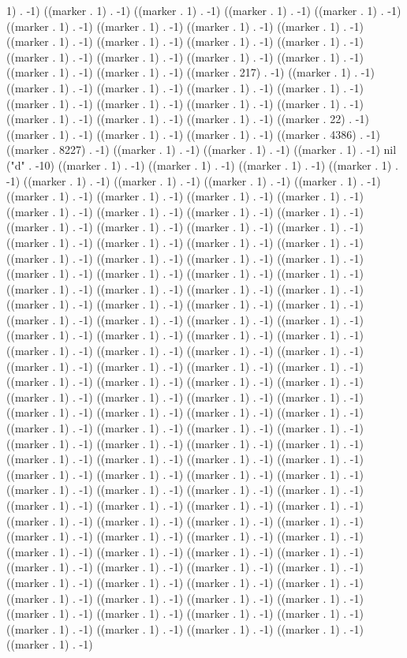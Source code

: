 1) . -1) ((marker . 1) . -1) ((marker . 1) . -1) ((marker . 1) . -1) ((marker . 1) . -1) ((marker . 1) . -1) ((marker . 1) . -1) ((marker . 1) . -1) ((marker . 1) . -1) ((marker . 1) . -1) ((marker . 1) . -1) ((marker . 1) . -1) ((marker . 1) . -1) ((marker . 1) . -1) ((marker . 1) . -1) ((marker . 1) . -1) ((marker . 1) . -1) ((marker . 1) . -1) ((marker . 1) . -1) ((marker . 217) . -1) ((marker . 1) . -1) ((marker . 1) . -1) ((marker . 1) . -1) ((marker . 1) . -1) ((marker . 1) . -1) ((marker . 1) . -1) ((marker . 1) . -1) ((marker . 1) . -1) ((marker . 1) . -1) ((marker . 1) . -1) ((marker . 1) . -1) ((marker . 1) . -1) ((marker . 22) . -1) ((marker . 1) . -1) ((marker . 1) . -1) ((marker . 1) . -1) ((marker . 4386) . -1) ((marker . 8227) . -1) ((marker . 1) . -1) ((marker . 1) . -1) ((marker . 1) . -1) nil ("d" . -10) ((marker . 1) . -1) ((marker . 1) . -1) ((marker . 1) . -1) ((marker . 1) . -1) ((marker . 1) . -1) ((marker . 1) . -1) ((marker . 1) . -1) ((marker . 1) . -1) ((marker . 1) . -1) ((marker . 1) . -1) ((marker . 1) . -1) ((marker . 1) . -1) ((marker . 1) . -1) ((marker . 1) . -1) ((marker . 1) . -1) ((marker . 1) . -1) ((marker . 1) . -1) ((marker . 1) . -1) ((marker . 1) . -1) ((marker . 1) . -1) ((marker . 1) . -1) ((marker . 1) . -1) ((marker . 1) . -1) ((marker . 1) . -1) ((marker . 1) . -1) ((marker . 1) . -1) ((marker . 1) . -1) ((marker . 1) . -1) ((marker . 1) . -1) ((marker . 1) . -1) ((marker . 1) . -1) ((marker . 1) . -1) ((marker . 1) . -1) ((marker . 1) . -1) ((marker . 1) . -1) ((marker . 1) . -1) ((marker . 1) . -1) ((marker . 1) . -1) ((marker . 1) . -1) ((marker . 1) . -1) ((marker . 1) . -1) ((marker . 1) . -1) ((marker . 1) . -1) ((marker . 1) . -1) ((marker . 1) . -1) ((marker . 1) . -1) ((marker . 1) . -1) ((marker . 1) . -1) ((marker . 1) . -1) ((marker . 1) . -1) ((marker . 1) . -1) ((marker . 1) . -1) ((marker . 1) . -1) ((marker . 1) . -1) ((marker . 1) . -1) ((marker . 1) . -1) ((marker . 1) . -1) ((marker . 1) . -1) ((marker . 1) . -1) ((marker . 1) . -1) ((marker . 1) . -1) ((marker . 1) . -1) ((marker . 1) . -1) ((marker . 1) . -1) ((marker . 1) . -1) ((marker . 1) . -1) ((marker . 1) . -1) ((marker . 1) . -1) ((marker . 1) . -1) ((marker . 1) . -1) ((marker . 1) . -1) ((marker . 1) . -1) ((marker . 1) . -1) ((marker . 1) . -1) ((marker . 1) . -1) ((marker . 1) . -1) ((marker . 1) . -1) ((marker . 1) . -1) ((marker . 1) . -1) ((marker . 1) . -1) ((marker . 1) . -1) ((marker . 1) . -1) ((marker . 1) . -1) ((marker . 1) . -1) ((marker . 1) . -1) ((marker . 1) . -1) ((marker . 1) . -1) ((marker . 1) . -1) ((marker . 1) . -1) ((marker . 1) . -1) ((marker . 1) . -1) ((marker . 1) . -1) ((marker . 1) . -1) ((marker . 1) . -1) ((marker . 1) . -1) ((marker . 1) . -1) ((marker . 1) . -1) ((marker . 1) . -1) ((marker . 1) . -1) ((marker . 1) . -1) ((marker . 1) . -1) ((marker . 1) . -1) ((marker . 1) . -1) ((marker . 1) . -1) ((marker . 1) . -1) ((marker . 1) . -1) ((marker . 1) . -1) ((marker . 1) . -1) ((marker . 1) . -1) ((marker . 1) . -1) ((marker . 1) . -1) ((marker . 1) . -1) ((marker . 1) . -1) ((marker . 1) . -1) ((marker . 1) . -1) ((marker . 1) . -1) ((marker . 1) . -1) ((marker . 1) . -1) ((marker . 1) . -1) ((marker . 1) . -1) ((marker . 1) . -1) ((marker . 1) . -1) ((marker . 1) . -1) ((marker . 1) . -1) ((marker . 1) . -1) 